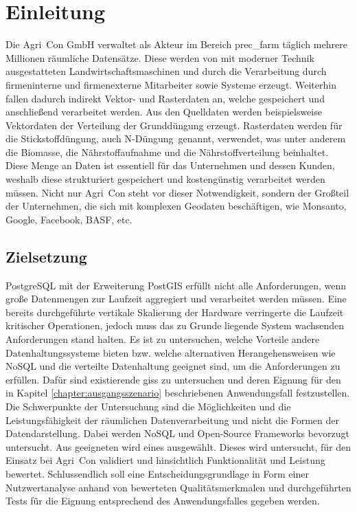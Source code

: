 \chapter{Einleitung}
Die Agri~Con GmbH verwaltet als Akteur im Bereich \Gls{prec_farm} täglich mehrere Millionen räumliche Datensätze.
Diese werden von mit moderner Technik ausgestatteten Landwirtschaftsmaschinen und durch die Verarbeitung durch firmeninterne und firmenexterne Mitarbeiter sowie Systeme erzeugt.
Weiterhin fallen dadurch indirekt Vektor- und Rasterdaten an, welche gespeichert und anschließend verarbeitet werden.
Aus den Quelldaten werden beispielsweise Vektordaten der Verteilung der Grunddüngung erzeugt.
Rasterdaten werden für die Stickstoffdüngung, auch \glqq N-Düngung\grqq\ genannt, verwendet, was unter anderem die Biomasse, die Nährstoffaufnahme und die Nährstoffverteilung beinhaltet.
Diese Menge an Daten ist essentiell für das Unternehmen und dessen Kunden, weshalb diese strukturiert gespeichert und kostengünstig verarbeitet werden müssen.
Nicht nur Agri~Con steht vor dieser Notwendigkeit, sondern der Großteil der Unternehmen, die sich mit komplexen Geodaten beschäftigen, wie Monsanto, Google, Facebook, BASF, etc.


\section{Zielsetzung}
PostgreSQL mit der Erweiterung PostGIS erfüllt nicht alle Anforderungen, wenn große Datenmengen zur Laufzeit aggregiert und verarbeitet werden müssen. %
Eine bereits durchgeführte vertikale Skalierung der Hardware verringerte die Laufzeit kritischer Operationen, jedoch muss das zu Grunde liegende System wachsenden Anforderungen stand halten.
Es ist zu untersuchen, welche Vorteile andere Datenhaltungssysteme bieten bzw. welche alternativen Herangehensweisen wie NoSQL und die verteilte Datenhaltung geeignet sind, um die Anforderungen zu erfüllen.
Dafür sind existierende \Glspl{gis} zu untersuchen und deren Eignung für den in Kapitel \ref{chapter:ausgangsszenario} beschriebenen Anwendungsfall festzustellen.
Die Schwerpunkte der Untersuchung sind die Möglichkeiten und die Leistungsfähigkeit der räumlichen Datenverarbeitung und nicht die Formen der Datendarstellung.
Dabei werden NoSQL und Open-Source Frameworks bevorzugt untersucht.
Aus geeigneten wird eines ausgewählt.
Dieses wird untersucht, für den Einsatz bei Agri~Con validiert und hinsichtlich Funktionalität und Leistung bewertet.
Schlussendlich soll eine Entscheidungsgrundlage in Form einer Nutzwertanalyse anhand von bewerteten Qualitätsmerkmalen und durchgeführten Tests für die Eignung entsprechend des Anwendungsfalles gegeben werden.

